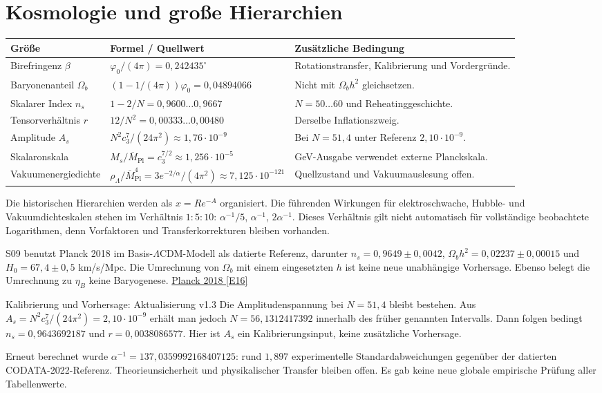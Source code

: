 \section{Kosmologie und große Hierarchien}
\begin{longtable}{L{36mm}L{49mm}L{65mm}}
\toprule \textbf{Größe}&\textbf{Formel / Quellwert}&\textbf{Zusätzliche Bedingung}\\\midrule\endhead
Birefringenz $\beta$&$\varphi_0/(4\pi)=0{,}242435^\circ$&Rotationstransfer, Kalibrierung und Vordergründe.\\
Baryonenanteil $\Omega_b$&$(1-1/(4\pi))\varphi_0=0{,}04894066$&Nicht mit $\Omega_bh^2$ gleichsetzen.\\
Skalarer Index $n_s$&$1-2/N=0{,}9600\ldots0{,}9667$&$N=50\ldots60$ und Reheatinggeschichte.\\
Tensorverhältnis $r$&$12/N^2=0{,}00333\ldots0{,}00480$&Derselbe Inflationszweig.\\
Amplitude $A_s$&$N^2c_3^7/(24\pi^2)\approx1{,}76\cdot10^{-9}$&Bei $N=51{,}4$ unter Referenz $2{,}10\cdot10^{-9}$.\\
Skalaronskala&$M_s/\overline M_{\mathrm{Pl}}=c_3^{7/2}\approx1{,}256\cdot10^{-5}$&GeV-Ausgabe verwendet externe Planckskala.\\
Vakuumenergiedichte&$\rho_\Lambda/\overline M_{\mathrm{Pl}}^4=3e^{-2/\alpha}/(4\pi^2)\approx7{,}125\cdot10^{-121}$&Quellzustand und Vakuumauslesung offen.\\\bottomrule
\end{longtable}
Die historischen Hierarchien werden als $x=R e^{-A}$ organisiert. Die führenden Wirkungen für elektroschwache, Hubble- und Vakuumdichteskalen stehen im Verhältnis $1:5:10$: $\alpha^{-1}/5$, $\alpha^{-1}$, $2\alpha^{-1}$. Dieses Verhältnis gilt nicht automatisch für vollständige beobachtete Logarithmen, denn Vorfaktoren und Transferkorrekturen bleiben vorhanden.

S09 benutzt Planck 2018 im Basis-$\Lambda$CDM-Modell als datierte Referenz, darunter $n_s=0{,}9649\pm0{,}0042$, $\Omega_bh^2=0{,}02237\pm0{,}00015$ und $H_0=67{,}4\pm0{,}5$ km/s/Mpc. Die Umrechnung von $\Omega_b$ mit einem eingesetzten $h$ ist keine neue unabhängige Vorhersage. Ebenso belegt die Umrechnung zu $\eta_B$ keine Baryogenese. \href{https://arxiv.org/abs/1807.06209}{Planck 2018 [E16]}

\begin{grenze}{Kalibrierung und Vorhersage: Aktualisierung v1.3}
Die Amplitudenspannung bei $N=51{,}4$ bleibt bestehen. Aus $A_s=N^2c_3^7/(24\pi^2)=2{,}10\cdot10^{-9}$ erhält man jedoch $N=56{,}1312417392$ innerhalb des früher genannten Intervalls. Dann folgen bedingt $n_s=0{,}9643692187$ und $r=0{,}0038086577$. Hier ist $A_s$ ein Kalibrierungsinput, keine zusätzliche Vorhersage.

Erneut berechnet wurde $\alpha^{-1}=137{,}0359992168407125$: rund $1{,}897$ experimentelle Standardabweichungen gegenüber der datierten CODATA-2022-Referenz. Theorieunsicherheit und physikalischer Transfer bleiben offen. Es gab keine neue globale empirische Prüfung aller Tabellenwerte.
\end{grenze}

